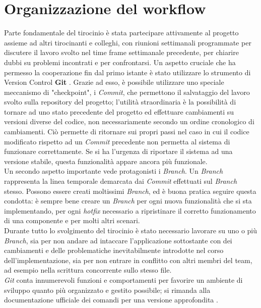 \section{Organizzazione del workflow}

Parte fondamentale del tirocinio è stata partecipare attivamente al progetto assieme ad altri tirocinanti e colleghi, con riunioni settimanali programmate per discutere il lavoro svolto nel time frame settimanale precedente, per chiarire dubbi su problemi incontrati e per confrontarsi. Un aspetto cruciale che ha permesso la cooperazione fin dal primo istante è stato utilizzare lo strumento di Version Control \textbf{Git} \cite{git}. Grazie ad esso, è possibile utilizzare uno speciale meccanismo di "checkpoint", i \textit{Commit}, che permettono il salvataggio del lavoro svolto sulla repository del progetto; l'utilità straordinaria è la possibilità di tornare ad uno stato precedente del progetto ed effettuare cambiamenti su versioni diverse del codice, non necessariamente secondo un ordine cronologico di cambiamenti. Ciò permette di ritornare sui propri passi nel caso in cui il codice modificato rispetto ad un \textit{Commit} precedente non permetta al sistema di funzionare correttamente. Se si ha l'urgenza di riportare il sistema ad una versione stabile, questa funzionalità appare ancora più funzionale.\\
Un secondo aspetto importante vede protagonisti i \textit{Branch}. Un \textit{Branch} rappresenta la linea temporale demarcata dai \textit{Commit} effettuati sul \textit{Branch} stesso. Possono essere creati moltissimi \textit{Branch}, ed è buona pratica seguire questa condotta: è sempre bene creare un \textit{Branch} per ogni nuova funzionalità che si sta implementando, per ogni \textit{hotfix} necessario a ripristinare il corretto funzionamento di una componente e per molti altri scenari.\\
Durante tutto lo svolgimento del tirocinio è stato necessario lavorare su uno o più \textit{Branch}, sia per non andare ad intaccare l'applicazione sottostante con dei cambiamenti e delle problematiche inevitabilmente introdotte nel corso dell'implementazione, sia per non entrare in conflitto con altri membri del team, ad esempio nella scrittura concorrente sullo stesso file.\\
\textit{Git} conta innumerevoli funzioni e comportamenti per favorire un ambiente di sviluppo quanto più organizzato e gestito possibile; si rimanda alla documentazione ufficiale dei comandi per una versione approfondita \cite{git}. 